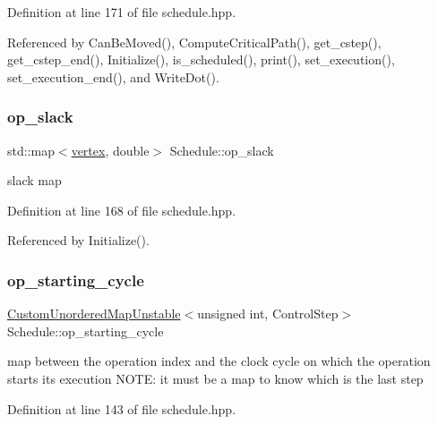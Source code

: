 Definition at line 171 of file schedule.\+hpp.



Referenced by Can\+Be\+Moved(), Compute\+Critical\+Path(), get\+\_\+cstep(), get\+\_\+cstep\+\_\+end(), Initialize(), is\+\_\+scheduled(), print(), set\+\_\+execution(), set\+\_\+execution\+\_\+end(), and Write\+Dot().

\mbox{\label{classSchedule_a9bd31f768fd00bc8d3a3eb1b3bd4c332}} 
\subsubsection{\texorpdfstring{op\+\_\+slack}{op\_slack}}
{\footnotesize\ttfamily std\+::map$<$\hyperlink{graph_8hpp_abefdcf0544e601805af44eca032cca14}{vertex}, double$>$ Schedule\+::op\+\_\+slack\hspace{0.3cm}{\ttfamily [private]}}



slack map 



Definition at line 168 of file schedule.\+hpp.



Referenced by Initialize().

\mbox{\label{classSchedule_ad9a0a7a8305f6db7d2dcd3a7d613179f}} 
\subsubsection{\texorpdfstring{op\+\_\+starting\+\_\+cycle}{op\_starting\_cycle}}
{\footnotesize\ttfamily \hyperlink{custom__map_8hpp_a8cbaceffc09790a885ec7e9c17809c69}{Custom\+Unordered\+Map\+Unstable}$<$unsigned int, Control\+Step$>$ Schedule\+::op\+\_\+starting\+\_\+cycle\hspace{0.3cm}{\ttfamily [private]}}



map between the operation index and the clock cycle on which the operation starts its execution N\+O\+TE\+: it must be a map to know which is the last step 



Definition at line 143 of file schedule.\+hpp.



